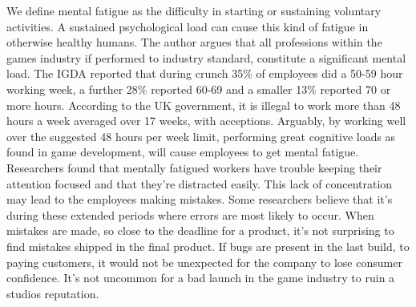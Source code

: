 \documentclass{scrartcl}
\begin{document}
We define mental fatigue as the difficulty in starting or sustaining voluntary activities\cite{chaudhuri2004fatigue}. A sustained psychological load can cause this kind of fatigue in otherwise healthy humans\cite {mizuno2011mental}. The author argues that all professions within the games industry if performed to industry standard, constitute a significant mental load. The IGDA reported that during crunch 35\% of employees did a 50-59 hour working week, a further 28\% reported 60-69 and a smaller 13\% reported 70 or more hours\cite[p.20]{weststarlegault2016}. According to the UK government, it is illegal to work more than 48 hours a week averaged over 17 weeks, with acceptions\cite{maximumweeklyhours}. Arguably, by working well over the suggested 48 hours per week limit, performing great cognitive loads as found in game development, will cause employees to get mental fatigue. Researchers found that mentally fatigued workers have trouble keeping their attention focused and that they're distracted easily\cite{bartlett1943ferrier}. This lack of concentration may lead to the employees making mistakes. Some researchers believe that it's during these extended periods where errors are most likely to occur\cite{olson2011overtime}. When mistakes are made, so close to the deadline for a product, it's not surprising to find mistakes shipped in the final product. If bugs are present in the last build, to paying customers, it would not be unexpected for the company to lose consumer confidence.  It's not uncommon for a bad launch in the game industry to ruin a studios reputation. 
\end{document}
